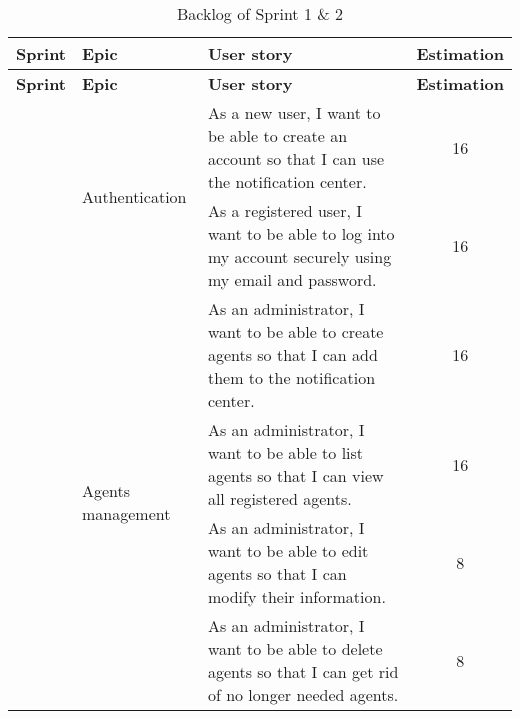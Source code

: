 \begin{longtable}{ | m{}  | m{} | m{} | c | }
    \caption{Backlog of Sprint 1 \& 2}                                                                                                                                                                                                          \\
    \hline
    \textbf{Sprint}         & \textbf{Epic}                                       & \textbf{User story}                                                                                                                   & \textbf{Estimation} \\
    \hline
    \endfirsthead
    \hline
    \textbf{Sprint}         & \textbf{Epic}                                       & \textbf{User story}                                                                                                                   & \textbf{Estimation} \\
    \hline
    \endhead
    \hline
    \endfoot
    \endlastfoot
    \multirow[t]{3}{5em}{1} & \multirow{2}{5em}{Authentication}                   & As a new user, I want to be able to create an account so that I can use the notification center.                                      & 16                  \\
    \cline{3-4}
                            &                                                     & As a registered user, I want to be able to log into my account securely using my email and password.                                  & 16                  \\
    \cline{2-4}
                            & \multirow{4}{5em}{Agents management}                & As an administrator, I want to be able to create agents so that I can add them to the notification center.                            & 16                  \\
    \cline{3-4}
                            &                                                     & As an administrator, I want to be able to list agents so that I can view all registered agents.                                       & 16                  \\
    \cline{3-4}
                            &                                                     & As an administrator, I want to be able to edit agents so that I can modify their information.                                         & 8                   \\
    \cline{3-4}
                            &                                                     & As an administrator, I want to be able to delete agents so that I can get rid of no longer needed agents.                             & 8                   \\

\end{longtable}
